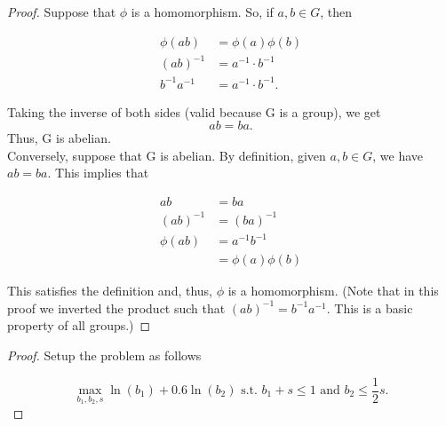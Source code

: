 \documentclass{amsart}
\begin{document}

    \begin{proof}
    Suppose that $\phi$ is a homomorphism. So, if $a,b \in G$, then 
    
    \begin{align*}
    \phi(a b)       &= \phi(a) \phi(b) \\
    (a b)^{-1}      &= a^{-1} \cdot b^{-1} \\
    b^{-1} a^{-1}   &= a^{-1} \cdot b^{-1}.    
    \end{align*}
    
    Taking the inverse of both sides (valid because G is a group), we get
    \[ ab = ba. \] Thus, G is abelian.\\
    
    Conversely, suppose that G is abelian. By definition, given $a,b \in G$, we
    have $a b = b a$. This implies that
    
    \begin{align*}
    a b         &= b a \\
    (a b)^{-1}  &= (b a)^{-1} \\
    \phi(ab)    &= a^{-1} b^{-1} \\
                &= \phi(a) \phi(b)
    \end{align*}
    
    This satisfies the definition and, thus, $\phi$ is a homomorphism. (Note
    that in this proof we inverted the product such that $(ab)^{-1} = b^{-1}
    a^{-1}$. This is a basic property of all groups.)
    
    \end{proof}


    \begin{proof}

    Setup the problem as follows

    \[ \max_{b_1,b_2,s} \ln(b_1) + 0.6 \ln(b_2) \text{ s.t. } b_1 + s \leq 1 \text{ and } b_2 \leq \frac{1}{2} s.\]

    \end{proof}
\end{document}
